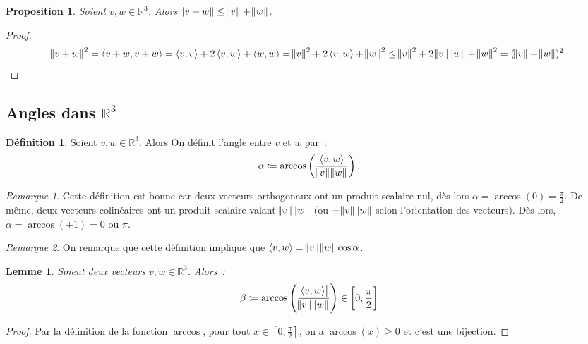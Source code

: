 \documentclass{article}
\newcommand{\R}{\mathbb R}
\newcommand{\scpr}[2]{\left\langle #1, #2\right\rangle}
\renewcommand{\interval}[2]{\left[#1, #2\right]}
\newtheorem{prp}[thm]{Proposition}
\newtheorem{lem}[thm]{Lemme}
\theoremstyle{definition}
\newtheorem{déf}[thm]{Définition}
\theoremstyle{remark}
\newtheorem*{rmq}{Remarque}
\begin{document}
		\begin{prp} Soient $v, w \in \R^3$. Alors $\norm {v+w} \leq \norm v+\norm w$. \end{prp}

		\begin{proof} \[\norm {v+w}^2 = \scpr {v+w}{v+w} = \scpr vv + 2\scpr vw + \scpr ww = \norm v^2 + 2\scpr vw + \norm w^2 \leq \norm v^2 + 2\norm v\norm w + \norm w^2
		= (\norm v + \norm w)^2.\] \end{proof}

	\subsection{Angles dans $\R^3$}
		\begin{déf} Soient $v, w \in \R^3$. Alors On définit l'angle entre $v$ et $w$ par~:
		\[\alpha \coloneqq \arccos\left(\frac {\scpr vw}{\norm v\norm w}\right).\] \end{déf}

		\begin{rmq} Cette définition est bonne car deux vecteurs orthogonaux ont un produit scalaire nul, dès lors $\alpha = \arccos(0) = \frac \pi2$. De même, deux
		vecteurs colinéaires ont un produit scalaire valant $\norm v\norm w$ (ou $-\norm v\norm w$ selon l'orientation des vecteurs). Dès lors,
		$\alpha = \arccos(\pm 1) = 0$ ou $\pi$. \end{rmq}

		\begin{rmq} On remarque que cette définition implique que $\scpr vw = \norm v\norm w \cos \alpha$. \end{rmq}

		\begin{lem} Soient deux vecteurs $v, w \in \R^3$. Alors~:\[\beta \coloneqq \arccos\left(\frac {\abs {\scpr vw}}{\norm v\norm w}\right) \in \interval 0{\frac \pi2}\]
		\end{lem}

		\begin{proof} Par la définition de la fonction $\arccos$, pour tout $x \in \interval 0{\frac \pi2}$, on a $\arccos(x) \geq 0$ et c'est une bijection. \end{proof}
\end{document}
